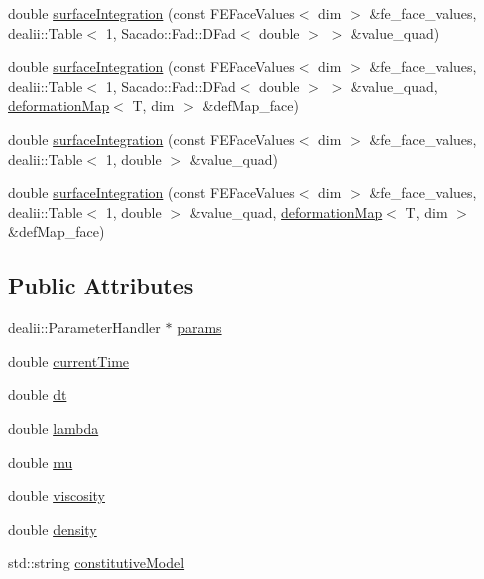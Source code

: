 \begin{DoxyCompactItemize}
\item 
double \mbox{\hyperlink{class_residual_a6753ecdc0e19b7bac24615d47889ae65}{surface\+Integration}} (const F\+E\+Face\+Values$<$ dim $>$ \&fe\+\_\+face\+\_\+values, dealii\+::\+Table$<$ 1, Sacado\+::\+Fad\+::\+D\+Fad$<$ double $>$ $>$ \&value\+\_\+quad)
\item 
double \mbox{\hyperlink{class_residual_a71923ccf434fa6503c37afd0ca7d0100}{surface\+Integration}} (const F\+E\+Face\+Values$<$ dim $>$ \&fe\+\_\+face\+\_\+values, dealii\+::\+Table$<$ 1, Sacado\+::\+Fad\+::\+D\+Fad$<$ double $>$ $>$ \&value\+\_\+quad, \mbox{\hyperlink{structdeformation_map}{deformation\+Map}}$<$ T, dim $>$ \&def\+Map\+\_\+face)
\item 
double \mbox{\hyperlink{class_residual_a454c4fd90cd46e3108e3d76eccbf2075}{surface\+Integration}} (const F\+E\+Face\+Values$<$ dim $>$ \&fe\+\_\+face\+\_\+values, dealii\+::\+Table$<$ 1, double $>$ \&value\+\_\+quad)
\item 
double \mbox{\hyperlink{class_residual_a8c32782b660888461d7b8f8a728b2751}{surface\+Integration}} (const F\+E\+Face\+Values$<$ dim $>$ \&fe\+\_\+face\+\_\+values, dealii\+::\+Table$<$ 1, double $>$ \&value\+\_\+quad, \mbox{\hyperlink{structdeformation_map}{deformation\+Map}}$<$ T, dim $>$ \&def\+Map\+\_\+face)
\end{DoxyCompactItemize}
\subsection*{Public Attributes}
\begin{DoxyCompactItemize}
\item 
dealii\+::\+Parameter\+Handler $\ast$ \mbox{\hyperlink{class_residual_accca5aede13ea52f0c11dff4daf1ad97}{params}}
\item 
double \mbox{\hyperlink{class_residual_a272038ad264893a568c808f13d818b17}{current\+Time}}
\item 
double \mbox{\hyperlink{class_residual_a03e28be41881b703c836edbfe9b51b17}{dt}}
\item 
double \mbox{\hyperlink{class_residual_a3db359547eed8cfd48ca821d95f577af}{lambda}}
\item 
double \mbox{\hyperlink{class_residual_a74577585cf12d1712ab9c57616d49205}{mu}}
\item 
double \mbox{\hyperlink{class_residual_ad80875e5d1c4362e2eae93663ad723fb}{viscosity}}
\item 
double \mbox{\hyperlink{class_residual_a6f8c052f8417728038991f7f2826d38d}{density}}
\item 
std\+::string \mbox{\hyperlink{class_residual_a83be21658f82b0682f84f5dc9f10190f}{constitutive\+Model}}
\end{DoxyCompactItemize}


